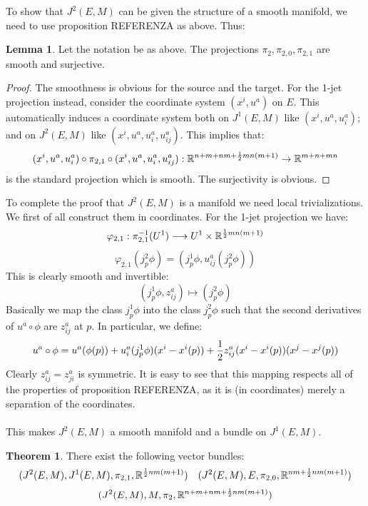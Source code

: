 \documentclass[12pt,a4paper]{report}
\theoremstyle{definition}
\theoremstyle{Theorem}
\newtheorem{Theo}[Def]{Theorem}
\newtheorem{Lm}[Def]{Lemma}
\theoremstyle{definition}
\theoremstyle{definition}
\begin{document}
	To show that $J^2(E,M)$ can be given the structure of a smooth manifold, we need to use proposition REFERENZA as above. Thus:
	\begin{Lm}
		Let the notation be as above. The projections $\pi_2,\pi_{2,0},\pi_{2,1}$ are smooth and surjective.
	\end{Lm}
	\begin{proof}
		The smoothness is obvious for the source and the target. For the 1-jet projection instead, consider the coordinate system $(x^i,u^a)$ on $E$. This automatically induces a coordinate system both on $J^1(E,M)$ like $(x^i,u^a,u^a_i)$; and on $J^2(E,M)$ like $(x^i,u^a,u^a_i,u^a_{ij})$. This implies that:
		$$(x^i,u^a,u^a_i)\circ \pi_{2,1}\circ (x^i,u^a,u^a_i,u^a_{ij}):\mathbb{R}^{n+m+nm+{1\over 2}mn(m+1)}\rightarrow\mathbb{R}^{m+n+mn}$$
		is the standard projection which is smooth. The surjectivity is obvious.
	\end{proof}
	To complete the proof that $J^2(E,M)$ is a manifold we need local trivializations. We first of all construct them in coordinates. For the 1-jet projection we have:
	$$\varphi_{2,1}:\pi_{2,1}^{-1}(U^1)\longrightarrow U^1\times \mathbb{R}^{{1\over 2}mn(m+1)}$$
	$$\varphi_{2,1}(j^2_p\phi)=(j^1_p\phi,u^a_{ij}(j^2_p\phi))$$
	This is clearly smooth and invertible:
	$$(j^1_p\phi,z^a_{ij})\mapsto(j^2_p\phi)$$
	Basically we map the class $j^1_p\phi$ into the class $j^2_p\phi$ such that the second derivatives of $u^a\circ \phi$ are $z^a_{ij}$ at $p$. In particular, we define:
	$$u^a\circ\phi=u^a(\phi(p))+u^a_i(j^1_p\phi)(x^i-x^i(p))+{1\over 2}z_{ij}^a(x^i-x^i(p))(x^j-x^j(p))$$
	Clearly $z_{ij}^a=z^a_{ji}$ is symmetric. It is easy to see that this mapping respects all of the properties of proposition REFERENZA, as it is (in coordinates) merely a separation of the coordinates.\\
	\\
	This makes $J^2(E,M)$ a smooth manifold and a bundle on $J^1(E,M)$. 
	\begin{Theo}
		There exist the following vector bundles:
		$$(J^2(E,M),J^1(E,M),\pi_{2,1},\mathbb{R}^{{1\over 2}nm(m+1)})\hspace{10 pt}(J^2(E,M),E,\pi_{2,0},\mathbb{R}^{nm+{1\over 2}nm(m+1)})$$
		$$\hspace{10 pt}(J^2(E,M),M,\pi_{2},\mathbb{R}^{n+m+nm+{1\over 2}nm(m+1)})\hspace{10 pt}$$
	\end{Theo}
\end{document}
